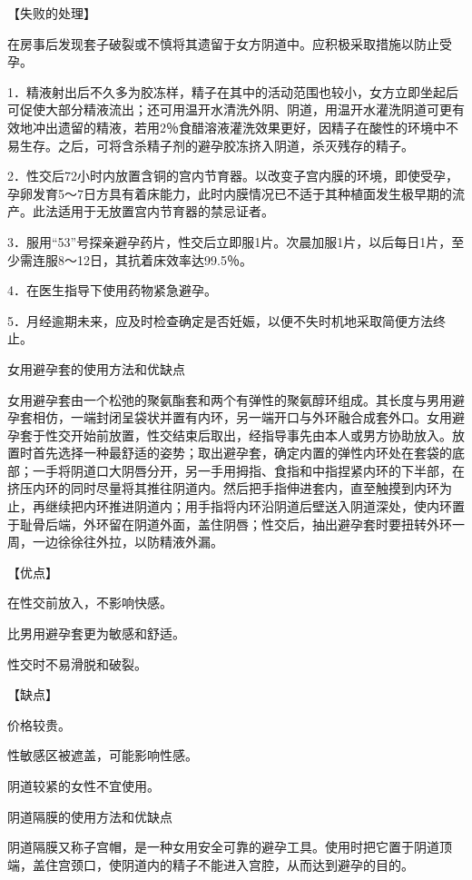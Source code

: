 \documentclass[12pt,UTF8]{ctexbook}
\begin{document}
【失败的处理】

在房事后发现套子破裂或不慎将其遗留于女方阴道中。应积极采取措施以防止受孕。

1．精液射出后不久多为胶冻样，精子在其中的活动范围也较小，女方立即坐起后可促使大部分精液流出；还可用温开水清洗外阴、阴道，用温开水灌洗阴道可更有效地冲出遗留的精液，若用2％食醋溶液灌洗效果更好，因精子在酸性的环境中不易生存。之后，可将含杀精子剂的避孕胶冻挤入阴道，杀灭残存的精子。

2．性交后72小时内放置含铜的宫内节育器。以改变子宫内膜的环境，即使受孕，孕卵发育5～7日方具有着床能力，此时内膜情况已不适于其种植面发生极早期的流产。此法适用于无放置宫内节育器的禁忌证者。

3．服用“53”号探亲避孕药片，性交后立即服1片。次晨加服1片，以后每日1片，至少需连服8～12日，其抗着床效率达99.5％。

4．在医生指导下使用药物紧急避孕。

5．月经逾期未来，应及时检查确定是否妊娠，以便不失时机地采取简便方法终止。





女用避孕套的使用方法和优缺点


女用避孕套由一个松弛的聚氨酯套和两个有弹性的聚氨醇环组成。其长度与男用避孕套相仿，一端封闭呈袋状并置有内环，另一端开口与外环融合成套外口。女用避孕套于性交开始前放置，性交结束后取出，经指导事先由本人或男方协助放入。放置时首先选择一种最舒适的姿势；取出避孕套，确定内置的弹性内环处在套袋的底部；一手将阴道口大阴唇分开，另一手用拇指、食指和中指捏紧内环的下半部，在挤压内环的同时尽量将其推往阴道内。然后把手指伸进套内，直至触摸到内环为止，再继续把内环推进阴道内；用手指将内环沿阴道后壁送入阴道深处，使内环置于耻骨后端，外环留在阴道外面，盖住阴唇；性交后，抽出避孕套时要扭转外环一周，一边徐徐往外拉，以防精液外漏。

【优点】

在性交前放入，不影响快感。

比男用避孕套更为敏感和舒适。

性交时不易滑脱和破裂。

【缺点】

价格较贵。

性敏感区被遮盖，可能影响性感。

阴道较紧的女性不宜使用。





阴道隔膜的使用方法和优缺点


阴道隔膜又称子宫帽，是一种女用安全可靠的避孕工具。使用时把它置于阴道顶端，盖住宫颈口，使阴道内的精子不能进入宫腔，从而达到避孕的目的。
\end{document}
